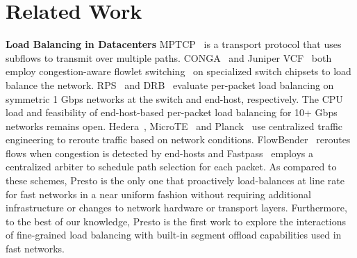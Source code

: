 \chapter{Related Work}
\label{thesis:chapter:related}

{\bf Load Balancing in Datacenters} 
MPTCP~\cite{mptcp,dc-mptcp} is a transport protocol that uses subflows to 
transmit over multiple paths.
CONGA~\cite{conga} and Juniper VCF~\cite{juniper-vcf} both employ congestion-aware flowlet switching~\cite{flowlet} on
specialized switch chipsets to load balance the network.
RPS~\cite{packetspray} and DRB~\cite{drb} evaluate per-packet load balancing on symmetric 1 Gbps networks
at the switch and end-host, respectively.
The CPU load and feasibility of end-host-based per-packet load balancing for 10+ Gbps networks remains open.
Hedera~\cite{hedera}, MicroTE~\cite{microte} and Planck~\cite{planck} use centralized traffic engineering to
reroute traffic based on network conditions.
FlowBender~\cite{flowbender} reroutes flows when congestion is detected by end-hosts and 
Fastpass~\cite{fastpass} employs a centralized arbiter to schedule path selection for each packet.
As compared to these schemes, Presto is the only one that proactively load-balances at line rate for fast networks
in a near uniform fashion without requiring additional infrastructure or changes
to network hardware or transport layers. Furthermore, to the best of our knowledge, Presto is
the first work to explore the interactions of fine-grained load balancing with built-in
segment offload capabilities used in fast networks.

